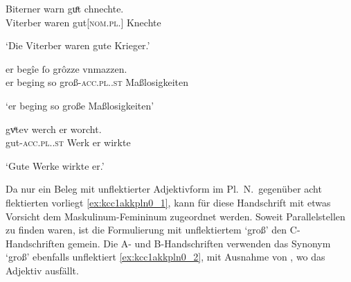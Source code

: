 \begin{exe}
\ex \label{ex:kcc1regel}
	\begin{xlist}
	\ex \label{ex:kcc1regel_1}
		\gll Biterner warn guͤt chnechte. \\
			Viterber waren gut[\textsc{nom.pl.\MascM}] Knechte \\
		\begin{taggedline}{\parencites[\pno~23\vb, 33]{kc:C1}[vgl.][4383]{schroeder1895}}
		\trans `Die Viterber waren gute Krieger.'
		\end{taggedline}

	\ex \label{ex:kcc1regel_2}
		\gll er begîe ſo grôzze vnmazzen. \\
			er beging so groß-\textsc{acc.pl.\FemI.st} Maßlosigkeiten \\
		\begin{taggedline}{\parencites[\pno~7\ra, 18]{kc:C1}[vgl.][1286]{schroeder1895}}
		\trans `er beging so große Maßlosigkeiten'
		\end{taggedline}

	\ex \label{ex:kcc1regel_3}
		\gll gvͤtev werch er worcht. \\
			gut-\textsc{acc.pl.\NeutI.st} Werk er wirkte \\
		\begin{taggedline}{\parencites[\pno~68\vb, 2]{kc:C1}[vgl.][13072]{schroeder1895}}
		\trans `Gute Werke wirkte er.'
		\end{taggedline}
	\end{xlist}
\end{exe}

Da nur ein Beleg mit unflektierter Adjektivform im Pl.~N.\ gegenüber
acht flektierten vorliegt \cref{ex:kcc1akkpln0_1}, kann  für diese
Handschrift mit etwas Vorsicht dem Maskulinum-Femininum zugeordnet werden.
Soweit Parallelstellen zu finden waren, ist die Formulierung mit unflektiertem
 `groß' den C-Handschriften gemein. Die A- und B-Handschriften
verwenden das Synonym  `groß' ebenfalls unflektiert
\cref{ex:kcc1akkpln0_2}, mit Ausnahme von \citet{kc:VB}, wo das Adjektiv
ausfällt.

